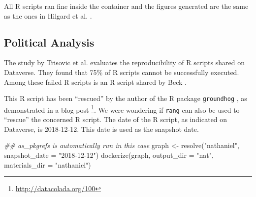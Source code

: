 \documentclass[
  10pt,
  letterpaper,
]{article}
\newenvironment{Shaded}{\begin{snugshade}}{\end{snugshade}}
\newcommand{\AttributeTok}[1]{\textcolor[rgb]{0.40,0.45,0.13}{#1}}
\newcommand{\BuiltInTok}[1]{\textcolor[rgb]{0.00,0.23,0.31}{#1}}
\newcommand{\ControlFlowTok}[1]{\textcolor[rgb]{0.00,0.23,0.31}{#1}}
\newcommand{\DocumentationTok}[1]{\textcolor[rgb]{0.37,0.37,0.37}{\textit{#1}}}
\newcommand{\ExtensionTok}[1]{\textcolor[rgb]{0.00,0.23,0.31}{#1}}
\newcommand{\FunctionTok}[1]{\textcolor[rgb]{0.28,0.35,0.67}{#1}}
\newcommand{\KeywordTok}[1]{\textcolor[rgb]{0.00,0.23,0.31}{#1}}
\newcommand{\NormalTok}[1]{\textcolor[rgb]{0.00,0.23,0.31}{#1}}
\newcommand{\OperatorTok}[1]{\textcolor[rgb]{0.37,0.37,0.37}{#1}}
\newcommand{\OtherTok}[1]{\textcolor[rgb]{0.00,0.23,0.31}{#1}}
\newcommand{\StringTok}[1]{\textcolor[rgb]{0.13,0.47,0.30}{#1}}
\newcommand{\VariableTok}[1]{\textcolor[rgb]{0.07,0.07,0.07}{#1}}
\begin{document}
\begin{Shaded}
\end{Shaded}

All R scripts ran fine inside the container and the figures generated
are the same as the ones in Hilgard et al. \citep{hilgard:2019:NEG}.

\hypertarget{political-analysis}{%
\subsection{Political Analysis}\label{political-analysis}}

The study by Trisovic et al. \citep{trisovic:2022} evaluates the
reproducibility of R scripts shared on Dataverse. They found that 75\%
of R scripts cannot be successfully executed. Among these failed R
scripts is an R script shared by Beck \citep{beck:2019:EGD}.

This R script has been ``rescued'' by the author of the R package
\texttt{groundhog} \citep{groundhogrpkg}, as demonstrated in a blog post
\footnote{\url{http://datacolada.org/100}}. We were wondering if
\texttt{rang} can also be used to ``rescue'' the concerned R script. The
date of the R script, as indicated on Dataverse, is 2018-12-12. This
date is used as the snapshot date.

\begin{Shaded}
\begin{Highlighting}[]
\DocumentationTok{\#\# as\_pkgrefs is automatically run in this case}
\NormalTok{graph }\OtherTok{\textless{}{-}} \FunctionTok{resolve}\NormalTok{(}\StringTok{"nathaniel"}\NormalTok{, }\AttributeTok{snapshot\_date =} \StringTok{"2018{-}12{-}12"}\NormalTok{)}
\FunctionTok{dockerize}\NormalTok{(graph, }\AttributeTok{output\_dir =} \StringTok{"nat"}\NormalTok{, }\AttributeTok{materials\_dir =} \StringTok{"nathaniel"}\NormalTok{)}
\end{Highlighting}
\end{Shaded}
\end{document}
